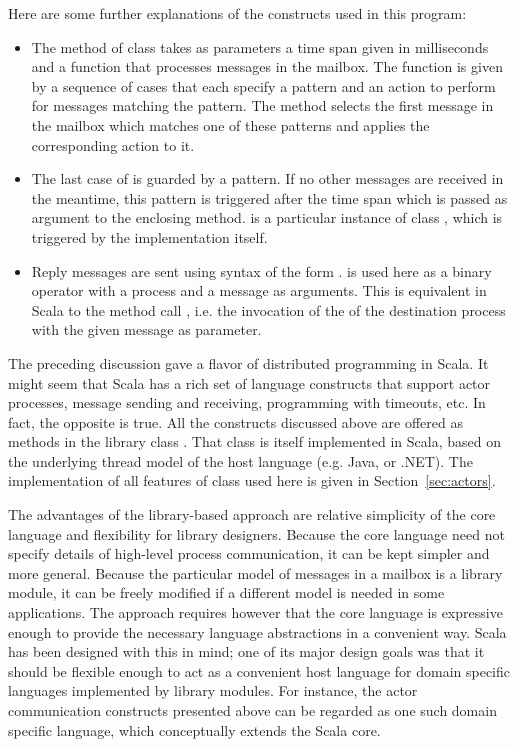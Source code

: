 Here are some further explanations of the constructs used in this
program:
\begin{itemize}
\item
The  method of class  takes as
parameters a time span given in milliseconds and a function that
processes messages in the mailbox. The function is given by a sequence
of cases that each specify a pattern and an action to perform for
messages matching the pattern. The  method selects
the first message in the mailbox which matches one of these patterns
and applies the corresponding action to it.
\item
The last case of  is guarded by a
 pattern. If no other messages are received in the meantime, this
pattern is triggered after the time span which is passed as argument
to the enclosing  method.  is a
particular instance of class , which is triggered by the
 implementation itself.
\item
Reply messages are sent using syntax of the form
.  is used here as a
binary operator with a process and a message as arguments. This is
equivalent in Scala to the method call
, i.e. the invocation of
the  of the destination process with the given message as
parameter.
\end{itemize}
The preceding discussion gave a flavor of distributed programming in
Scala. It might seem that Scala has a rich set of language constructs
that support actor processes, message sending and receiving,
programming with timeouts, etc. In fact, the opposite is true. All the
constructs discussed above are offered as methods in the library class
. That class is itself implemented in Scala, based on the underlying 
thread model of the host language (e.g. Java, or .NET).
The implementation of all features of class  used here is
given in Section~\ref{sec:actors}.

The advantages of the library-based approach are relative simplicity
of the core language and flexibility for library designers. Because
the core language need not specify details of high-level process
communication, it can be kept simpler and more general. Because the
particular model of messages in a mailbox is a library module, it can
be freely modified if a different model is needed in some
applications.  The approach requires however that the core language is
expressive enough to provide the necessary language abstractions in a
convenient way. Scala has been designed with this in mind; one of its
major design goals was that it should be flexible enough to act as a
convenient host language for domain specific languages implemented by
library modules. For instance, the actor communication constructs
presented above can be regarded as one such domain specific language,
which conceptually extends the Scala core.


